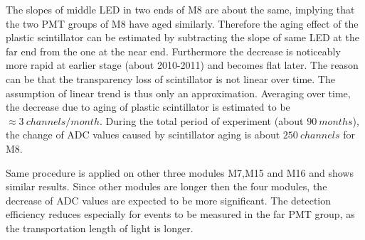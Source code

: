 The slopes of middle LED in two ends of M8 are about the same, implying that the two PMT groups of M8 have aged similarly. Therefore the aging effect of the plastic scintillator can be estimated by subtracting the slope of same LED at the far end from the one at the near end.
Furthermore the decrease is noticeably more rapid at earlier stage (about 2010-2011) and becomes flat later. The reason can be that the transparency loss of scintillator is not linear over time. The assumption of linear trend is thus only an approximation.
Averaging over time, the decrease due to aging of plastic scintillator is estimated to be $\approx \SI{3}{channels\per month}$.
During the total period of experiment (about $\SI{90}{months}$), the change of ADC values caused by scintillator aging is about $\SI{250}{channels}$ for M8.

Same procedure is applied on other three modules M7,M15 and M16 and shows similar results. Since other modules are longer then the four modules, the decrease of ADC values are expected to be more significant. The detection efficiency reduces especially for events to be measured in the far PMT group, as the transportation length of light is longer.
